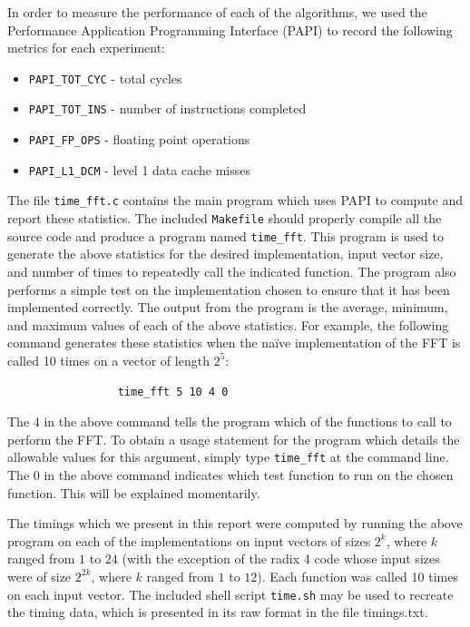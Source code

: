 \documentclass[11 pt]{article}
\begin{document}
In order to measure the performance of each of the algorithms, we used the
Performance Application Programming Interface (PAPI) to record the following
metrics for each experiment:

\begin{itemize}
\item {\tt PAPI\_TOT\_CYC} - total cycles
\item {\tt PAPI\_TOT\_INS} - number of instructions completed
\item {\tt PAPI\_FP\_OPS}  - floating point operations
\item {\tt PAPI\_L1\_DCM}  - level 1 data cache misses
\end{itemize}

The file {\tt time\_fft.c} contains the main program which uses PAPI to compute
and report these statistics.  The included {\tt Makefile} should properly
compile all the source code and produce a program named {\tt time\_fft}.  This
program is used to generate the above statistics for the desired
implementation, input vector size, and number of times to repeatedly call the
indicated function.  The program also performs a simple test on the
implementation chosen to ensure that it has been implemented correctly.  The
output from the program is the average, minimum, and maximum values of each of
the above statistics.  For example, the following command generates these
statistics when the na\"{i}ve implementation of the FFT is called 10 times on a
vector of length $2^5$:
\begin{verbatim}
                 time_fft 5 10 4 0
\end{verbatim}
The $4$ in the above command tells the program which of the functions to call
to perform the FFT.  To obtain a usage statement for the program which details
the allowable values for this argument, simply type {\tt time\_fft} at the
command line.  The $0$ in the above command indicates which test function to
run on the chosen function.  This will be explained momentarily.

The timings which we present in this report were computed by running the above
program on each of the implementations on input vectors of sizes $2^k$, where
$k$ ranged from $1$ to $24$ (with the exception of the radix 4 code whose input
sizes were of size $2^{2k}$, where $k$ ranged from $1$ to $12$).  Each function
was called 10 times on each input vector.  The included shell script
 {\tt time.sh} may be used to recreate the timing data, which is presented in 
its raw format in the file timings.txt.
\end{document}
